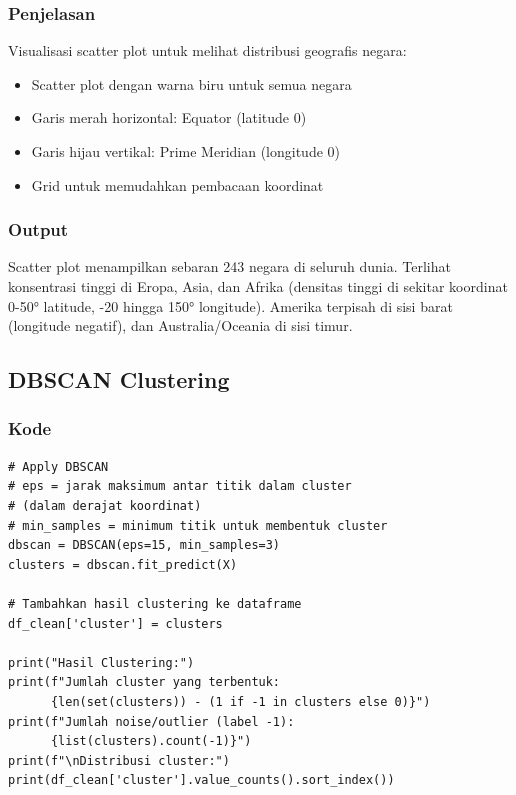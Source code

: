 \documentclass[12pt,a4paper]{article}
\begin{document}
\subsubsection{Penjelasan}
Visualisasi scatter plot untuk melihat distribusi geografis negara:
\begin{itemize}
    \item Scatter plot dengan warna biru untuk semua negara
    \item Garis merah horizontal: Equator (latitude 0)
    \item Garis hijau vertikal: Prime Meridian (longitude 0)
    \item Grid untuk memudahkan pembacaan koordinat
\end{itemize}

\subsubsection{Output}
Scatter plot menampilkan sebaran 243 negara di seluruh dunia. Terlihat konsentrasi tinggi di Eropa, Asia, dan Afrika (densitas tinggi di sekitar koordinat 0-50° latitude, -20 hingga 150° longitude). Amerika terpisah di sisi barat (longitude negatif), dan Australia/Oceania di sisi timur.

\subsection{DBSCAN Clustering}

\subsubsection{Kode}
\begin{lstlisting}[style=pythonstyle]
# Apply DBSCAN
# eps = jarak maksimum antar titik dalam cluster 
# (dalam derajat koordinat)
# min_samples = minimum titik untuk membentuk cluster
dbscan = DBSCAN(eps=15, min_samples=3)
clusters = dbscan.fit_predict(X)

# Tambahkan hasil clustering ke dataframe
df_clean['cluster'] = clusters

print("Hasil Clustering:")
print(f"Jumlah cluster yang terbentuk: 
      {len(set(clusters)) - (1 if -1 in clusters else 0)}")
print(f"Jumlah noise/outlier (label -1): 
      {list(clusters).count(-1)}")
print(f"\nDistribusi cluster:")
print(df_clean['cluster'].value_counts().sort_index())
\end{lstlisting}
\end{document}

